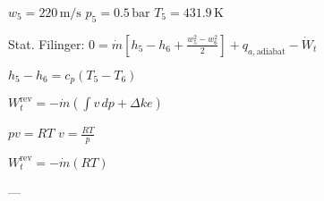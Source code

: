 \( w_5 = 220 \, \text{m/s} \)  
\( p_5 = 0.5 \, \text{bar} \)  
\( T_5 = 431.9 \, \text{K} \)  

Stat. Filinger:  
\( 0 = \dot{m} \left[ h_5 - h_6 + \frac{w_5^2 - w_6^2}{2} \right] + q_{a, \text{adiabat}} - \dot{W}_t \)  

\( h_5 - h_6 = c_p (T_5 - T_6) \)  

\( W_t^{\text{rev}} = -\dot{m} \left( \int v \, dp + \Delta ke \right) \)  

\( pv = RT \)  
\( v = \frac{RT}{p} \)  

\( W_t^{\text{rev}} = -\dot{m} \left( RT \right) \)  

---